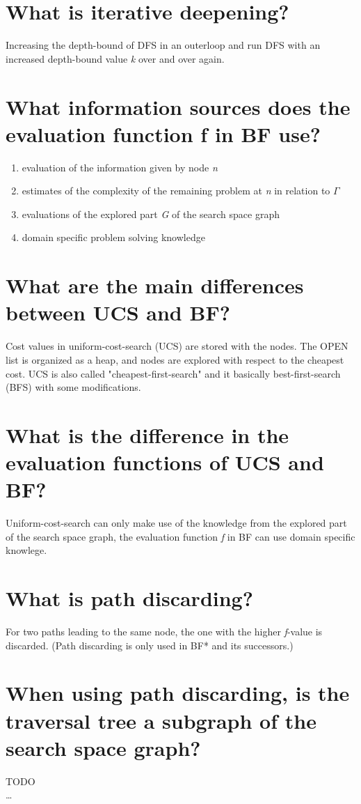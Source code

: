 \documentclass[12pt, a4paper]{article}
\begin{document}
\section{What is iterative deepening?}
Increasing the depth-bound of DFS in an outerloop and run DFS with an increased depth-bound value \textit{k} over and over again.

\section{What information sources does the evaluation function f in BF use?}
\begin{enumerate}
\item evaluation of the information given by node \textit{n}
\item estimates of the complexity of the remaining problem at \textit{n} in relation to $\Gamma$
\item evaluations of the explored part \textit{G} of the search space graph
\item domain specific problem solving knowledge
\end{enumerate}

\section{What are the main differences between UCS and BF?}
Cost values in uniform-cost-search (UCS) are stored with the nodes. The OPEN list is organized as a heap, and nodes are explored with respect to the cheapest cost. UCS is also called "cheapest-first-search" and it basically best-first-search (BFS) with some modifications.

\section{What is the difference in the evaluation functions of UCS and BF?}
Uniform-cost-search can only make use of the knowledge from the explored part of the search space graph, the evaluation function \textit{f} in BF can use domain specific knowlege.

\section{What is path discarding?}
For two paths leading to the same node, the one with the higher \textit{f}-value is discarded. (Path discarding is only used in BF* and its successors.)

\section{When using path discarding, is the traversal tree a subgraph of the search space graph?}
TODO \\
\ldots
\end{document}
